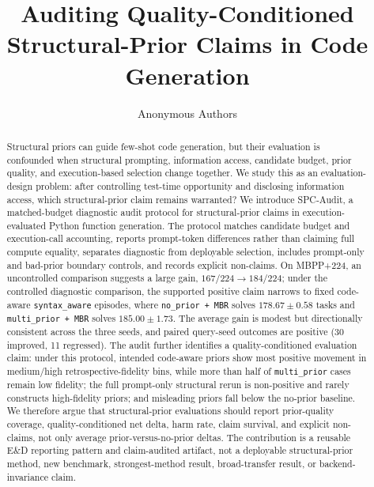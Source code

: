 \documentclass{article}
\title{Auditing Quality-Conditioned Structural-Prior Claims in Code Generation}
\author{Anonymous Authors}
\newcommand{\code}[1]{\texttt{#1}}
\begin{document}
\maketitle

\begin{abstract}
Structural priors can guide few-shot code generation, but their evaluation is confounded when structural prompting, information access, candidate budget, prior quality, and execution-based selection change together. We study this as an evaluation-design problem: after controlling test-time opportunity and disclosing information access, which structural-prior claim remains warranted? We introduce SPC-Audit, a matched-budget diagnostic audit protocol for structural-prior claims in execution-evaluated Python function generation. The protocol matches candidate budget and execution-call accounting, reports prompt-token differences rather than claiming full compute equality, separates diagnostic from deployable selection, includes prompt-only and bad-prior boundary controls, and records explicit non-claims. On MBPP+224, an uncontrolled comparison suggests a large gain, $167/224 \rightarrow 184/224$; under the controlled diagnostic comparison, the supported positive claim narrows to fixed code-aware \code{syntax\_aware} episodes, where \code{no\_prior + MBR} solves $178.67 \pm 0.58$ tasks and \code{multi\_prior + MBR} solves $185.00 \pm 1.73$. The average gain is modest but directionally consistent across the three seeds, and paired query-seed outcomes are positive (30 improved, 11 regressed). The audit further identifies a quality-conditioned evaluation claim: under this protocol, intended code-aware priors show most positive movement in medium/high retrospective-fidelity bins, while more than half of \code{multi\_prior} cases remain low fidelity; the full prompt-only structural rerun is non-positive and rarely constructs high-fidelity priors; and misleading priors fall below the no-prior baseline. We therefore argue that structural-prior evaluations should report prior-quality coverage, quality-conditioned net delta, harm rate, claim survival, and explicit non-claims, not only average prior-versus-no-prior deltas. The contribution is a reusable E\&D reporting pattern and claim-audited artifact, not a deployable structural-prior method, new benchmark, strongest-method result, broad-transfer result, or backend-invariance claim.
\end{abstract}
\end{document}
